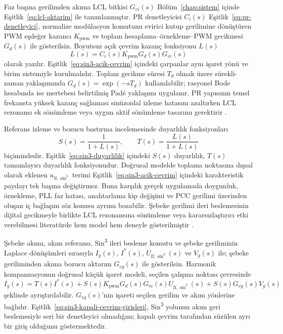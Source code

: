 Faz başına gerilimden akıma LCL bitkisi $G_{vi}(s)$ Bölüm~\ref{chap:sistem} içinde Eşitlik~\eqref{eq:lcl-aktarim} ile tanımlanmıştır. PR denetleyicisi $C_i(s)$ Eşitlik~\eqref{eq:pr-denetleyici}, normalize modülasyon komutunu evirici kutup gerilimine dönüştüren PWM eşdeğer kazancı $K_{\mathrm{pwm}}$ ve toplam hesaplama--örnekleme--PWM gecikmesi $G_d(s)$ ile gösterilsin. Boyutsuz açık çevrim kazanç fonksiyonu $L(s)$
\begin{equation}
  L(s)=C_i(s)K_{\mathrm{pwm}}G_d(s)G_{vi}(s)
  \label{eq:sin3-acik-cevrim}
\end{equation}
olarak yazılır. Eşitlik~\eqref{eq:sin3-acik-cevrim} içindeki çarpanlar aynı işaret yönü ve birim sistemiyle kurulmalıdır. Toplam gecikme süresi $T_d$ olmak üzere sürekli-zaman yaklaşımında $G_d(s)=\exp(-sT_d)$ kullanılabilir; rasyonel Bode hesabında ise mertebesi belirtilmiş Padé yaklaşımı uygulanır. PR yapısının temel frekansta yüksek kazanç sağlaması sinüzoidal izleme hatasını azaltırken LCL rezonansı ek sönümleme veya uygun aktif sönümleme tasarımı gerektirir \citep{Teodorescu2006PR,Zhang2014PR}.

Referans izleme ve bozucu bastırma incelemesinde duyarlılık fonksiyonları
\begin{equation}
  S(s)=\frac{1}{1+L(s)},
  \qquad
  T(s)=\frac{L(s)}{1+L(s)}
  \label{eq:sin3-duyarlilik}
\end{equation}
biçimindedir. Eşitlik~\eqref{eq:sin3-duyarlilik} içindeki $S(s)$ duyarlılık, $T(s)$ tamamlayıcı duyarlılık fonksiyonudur. Doğrusal modelde toplama noktasına dışsal olarak eklenen $u_{\mathrm{ff},\sin^3}$ terimi Eşitlik~\eqref{eq:sin3-acik-cevrim} içindeki karakteristik paydayı tek başına değiştirmez. Buna karşılık gerçek uygulamada doygunluk, örnekleme, PLL faz hatası, anahtarlama kip değişimi ve PCC gerilimi üzerinden oluşan iç bağlaşım söz konusu ayrımı bozabilir. Şebeke gerilimi ileri beslemesinin dijital gecikmeyle birlikte LCL rezonansına sönümleme veya kararsızlaştırıcı etki verebilmesi literatürde hem model hem deneyle gösterilmiştir \citep{Lu2016,Wang2024}.

Şebeke akımı, akım referansı, Sin\textsuperscript{3} ileri besleme komutu ve şebeke geriliminin Laplace dönüşümleri sırasıyla $I_g(s)$, $I^{\ast}(s)$, $U_{\mathrm{ff},\sin^3}(s)$ ve $V_g(s)$ ile; şebeke geriliminden akıma bozucu aktarım $G_{vg}(s)$ ile gösterilsin. Harmonik kompanzasyonun doğrusal küçük işaret modeli, seçilen çalışma noktası çevresinde
\begin{equation}
  I_g(s)=T(s)I^{\ast}(s)+S(s)K_{\mathrm{pwm}}G_d(s)G_{vi}(s)U_{\mathrm{ff},\sin^3}(s)
  +S(s)G_{vg}(s)V_g(s)
  \label{eq:sin3-kapali-cevrim-girisleri}
\end{equation}
şeklinde ayrıştırılabilir. $G_{vg}(s)$'nin işareti seçilen gerilim ve akım yönlerine bağlıdır. Eşitlik~\eqref{eq:sin3-kapali-cevrim-girisleri}, Sin\textsuperscript{3} yolunun akım geri beslemesiyle seri bir denetleyici olmadığını; kapalı çevrim tarafından süzülen ayrı bir giriş olduğunu göstermektedir.

